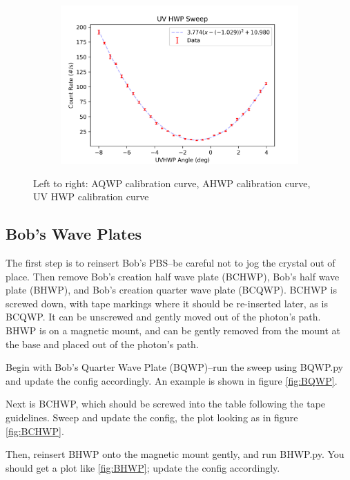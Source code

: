 \documentclass{paper}[11pt]
\begin{document}
\begin{figure}[t]
\begin{subfigure}{0.32\linewidth}
        \caption{}
        \label{fig:AHWP}
    \end{subfigure}
    \begin{subfigure}{0.32\linewidth}
        \centering
        \includegraphics[width=1\linewidth]{figs/UVHWP_sweep1.png}
        \caption{}
        \label{fig:UVHWP}
    \end{subfigure}
    \caption{Left to right: AQWP calibration curve, AHWP calibration curve, UV HWP calibration curve}
\end{figure}

\subsection{Bob's Wave Plates}
The first step is to reinsert Bob's PBS--be careful not to jog the crystal out of place. Then remove Bob's creation half wave plate (BCHWP), Bob's half wave plate (BHWP), and Bob's creation quarter wave plate (BCQWP). BCHWP is screwed down, with tape markings where it should be re-inserted later, as is BCQWP. It can be unscrewed and gently moved out of the photon's path. BHWP is on a magnetic mount, and can be gently removed from the mount at the base and placed out of the photon's path. 

Begin with Bob's Quarter Wave Plate (BQWP)--run the sweep using BQWP.py and update the config accordingly. An example is shown in figure \ref{fig:BQWP}. 

Next is BCHWP, which should be screwed into the table following the tape guidelines. Sweep and update the config, the plot looking as in figure \ref{fig:BCHWP}.

Then, reinsert BHWP onto the magnetic mount gently, and run BHWP.py. You should get a plot like \ref{fig:BHWP}; update the config accordingly. 
\end{document}
